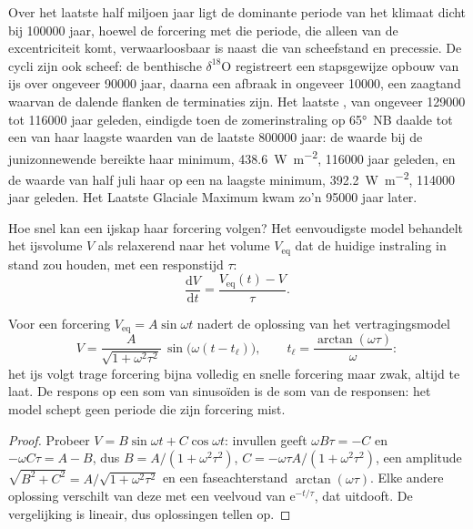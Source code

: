 Over het laatste half miljoen jaar ligt de dominante periode van het klimaat dicht bij \num{100000} jaar,
hoewel de forcering met die periode, die alleen van de excentriciteit komt, verwaarloosbaar is
naast die van scheefstand en precessie. De cycli zijn ook scheef: de benthische $\delta^{18}$O
registreert een stapsgewijze opbouw van ijs over ongeveer \num{90000} jaar, daarna een afbraak in ongeveer
\num{10000}, een zaagtand waarvan de dalende flanken de terminaties zijn. Het laatste , van
ongeveer \num{129000} tot \num{116000} jaar geleden, eindigde toen de zomerinstraling op \ang{65}~NB daalde
tot een van haar laagste waarden van de laatste \num{800000} jaar: de waarde bij de junizonnewende bereikte haar
minimum, \qty{438.6}{W.m^{-2}}, \num{116000} jaar geleden, en de waarde van half juli haar op een na laagste
minimum, \qty{392.2}{W.m^{-2}}, \num{114000} jaar geleden. Het Laatste Glaciale Maximum kwam zo'n
\num{95000} jaar later.

Hoe snel kan een ijskap haar forcering volgen? Het eenvoudigste model behandelt het ijsvolume $V$ als
relaxerend naar het volume $V_{\mathrm{eq}}$ dat de huidige instraling in stand zou houden, met een
responstijd $\tau$:
\[
  \frac{\mathrm dV}{\mathrm dt} = \frac{V_{\mathrm{eq}}(t) - V}{\tau} .
\]

\begin{proposition}\label{prop:b2:orbital-forcing:lag}
Voor een forcering $V_{\mathrm{eq}} = A\sin\omega t$ nadert de oplossing van het vertragingsmodel
\[
  V = \frac{A}{\sqrt{1 + \omega^2\tau^2}}\,\sin\bigl(\omega(t - t_{\ell})\bigr),\qquad
  t_{\ell} = \frac{\arctan(\omega\tau)}{\omega} :
\]
het ijs volgt trage forcering bijna volledig en snelle forcering maar zwak, altijd te laat. De respons
op een som van sinusoïden is de som van de responsen: het model schept geen periode die zijn forcering
mist.
\end{proposition}

\begin{proof}
Probeer $V = B\sin\omega t + C\cos\omega t$: invullen geeft $\omega B\tau = -C$ en $-\omega C\tau = A -
B$, dus $B = A/(1 + \omega^2\tau^2)$, $C = -\omega\tau A/(1 + \omega^2\tau^2)$, een amplitude
$\sqrt{B^2 + C^2} = A/\sqrt{1 + \omega^2\tau^2}$ en een faseachterstand $\arctan(\omega\tau)$. Elke andere
oplossing verschilt van deze met een veelvoud van $\mathrm e^{-t/\tau}$, dat uitdooft. De
vergelijking is lineair, dus oplossingen tellen op.
\end{proof}

